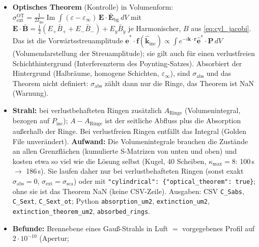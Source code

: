 \begin{itemize}[nosep]
        Brüchen bei allen Ringradien des Stapels, Panels $\le\pi/(2k_{\max})$, 16 Knoten), in $y$ je Ringschicht Panels
        $\le2/k_{\max}$ mit 8 Knoten (diese Höhen werden bei der Assemblierung aufgezeichnet); je Harmonischer
        $|\mathbf E|^2=\tfrac12(|E_+|^2+|E_-|^2)+|E_y|^2$, $\varphi$-Integral $2\pi$, Summe über $m$.
        $\sigma_{\text{abs}}=\tfrac1{2I_{\text{inc}}}\int\operatorname{Im}\varepsilon|\mathbf E|^2dV$,
        $\sigma_{\text{ext}}=\sigma_{\text{sca}}+\sigma_{\text{abs}}$.
  \item \textbf{Optisches Theorem} (Kontrolle) in Volumenform:
        $\sigma_{\text{ext}}^{\text{OT}}=\tfrac1{2I_{\text{inc}}}\operatorname{Im}\int(\varepsilon-\varepsilon_\infty)\,\mathbf E\cdot
        \bar{\mathbf E}_{\text{bg}}\,dV$ mit $\mathbf E\cdot\bar{\mathbf B}=\tfrac12(E_+\bar B_++E_-\bar B_-)+E_y\bar B_y$ je
        Harmonischer, $B$ aus \eqref{eq:cyl_jacobi}. Das ist die Vorwärtsstreuamplitude
        $\hat{\mathbf e}^*\cdot\mathbf f(\hat{\mathbf k}_{\text{inc}})\propto\int e^{-i\mathbf k\cdot\mathbf r}\hat{\mathbf e}^*\cdot\mathbf P\,dV$
        (Volumendarstellung der Streuamplitude); sie gilt auch für einen verlustfreien Schichthintergrund
        (Interferenzterm des Poynting-Satzes). Absorbiert der Hintergrund (Halbräume, homogene Schichten,
        $\varepsilon_\infty$), sind $\sigma_{\text{abs}}$ und das Theorem nicht definiert: $\sigma_{\text{abs}}$ zählt dann nur
        die Ringe, das Theorem ist NaN (Warnung).
  \item \textbf{Strahl:} bei verlustbehafteten Ringen zusätzlich $A_{\text{Ringe}}$ (Volumenintegral, bezogen auf
        $P_{\text{inc}}$); $A-A_{\text{Ringe}}$ ist der seitliche Abfluss plus die Absorption außerhalb der Ringe. Bei
        verlustfreien Ringen entfällt das Integral (Golden File unverändert). \textbf{Aufwand:} Die Volumenintegrale
        brauchen die Zustände an allen Grenzflächen (kumulierte S-Matrizen von unten und oben) und kosten etwa so viel wie
        die Lösung selbst (Kugel, 40 Scheiben, $\kappa_{\max}=8$: 100\,s $\to$ 186\,s). Sie laufen daher nur bei
        verlustbehafteten Ringen (sonst exakt $\sigma_{\text{abs}}=0$, $\sigma_{\text{ext}}=\sigma_{\text{sca}}$) oder mit
        \verb|"cylindrical": {"optical_theorem": true}|; ohne sie ist das Theorem NaN (keine CSV-Zeile).
        Ausgaben: CSV \verb|C_Sabs|, \verb|C_Sext|,
        \verb|C_Sext_ot|; Python \verb|absorption_um2|, \verb|extinction_um2|, \verb|extinction_theorem_um2|,
        \verb|absorbed_rings|.
  \item \textbf{Befunde:} Brennebene eines Gauß-Strahls in Luft $=$ vorgegebenes Profil auf $2\cdot10^{-10}$ (Apertur;

\end{itemize}
